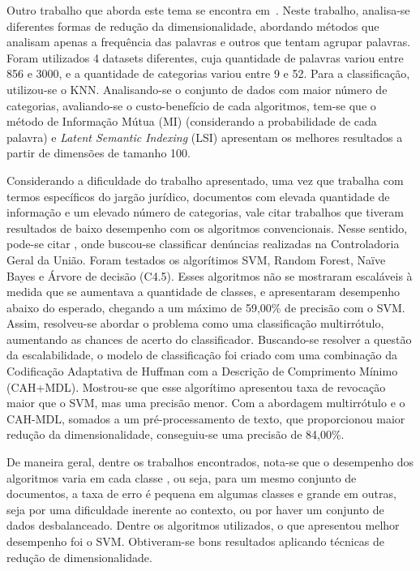 Outro trabalho que aborda este tema se encontra em~\cite{ciarelli_agglomeration_2009}. Neste trabalho, analisa-se diferentes formas de redução da dimensionalidade, abordando métodos que analisam apenas a frequência das palavras e outros que tentam agrupar palavras. Foram utilizados 4 datasets diferentes, cuja quantidade de palavras variou entre 856 e 3000, e a quantidade de categorias variou entre 9 e 52. Para a classificação, utilizou-se o KNN. Analisando-se o conjunto de dados com maior número de categorias, avaliando-se o custo-benefício de cada algoritmos, tem-se que o método de Informação Mútua (MI) (considerando a probabilidade de cada palavra) e \textit{Latent Semantic Indexing }(LSI) apresentam os melhores resultados a partir de dimensões de tamanho 100.

Considerando a dificuldade do trabalho apresentado, uma vez que trabalha com termos específicos do jargão jurídico, documentos com elevada quantidade de informação e um elevado número de categorias, vale citar trabalhos que tiveram resultados de baixo desempenho com os algoritmos convencionais. Nesse sentido, pode-se citar \cite{ladeirahuffman}, onde buscou-se classificar denúncias realizadas na Controladoria Geral da União. Foram testados os algorítimos SVM, Random Forest, Naïve Bayes e Árvore de decisão (C4.5). Esses algoritmos não se mostraram escaláveis à medida que se aumentava a quantidade de classes, e apresentaram desempenho abaixo do esperado, chegando a um máximo de 59,00\% de precisão com o SVM. Assim, resolveu-se abordar o problema como uma classificação multirrótulo, aumentando as chances de acerto do classificador. Buscando-se resolver a questão da escalabilidade, o modelo de classificação foi criado com uma combinação da Codificação Adaptativa de Huffman com a Descrição de Comprimento Mínimo (CAH+MDL). Mostrou-se que esse algorítimo apresentou taxa de revocação maior que o SVM, mas uma precisão menor. Com a abordagem multirrótulo e o CAH-MDL, somados a um pré-processamento de texto, que proporcionou maior redução da dimensionalidade, conseguiu-se uma precisão de 84,00\%.

De maneira geral, dentre os trabalhos encontrados, nota-se que o desempenho dos algoritmos varia em cada classe \cite{de_maat_machine_2010,goncalves_is_2005}, ou seja, para um mesmo conjunto de documentos, a taxa de erro é pequena em algumas classes e grande em outras, seja por uma dificuldade inerente ao contexto, ou por haver um conjunto de dados desbalanceado. 
Dentre os algoritmos utilizados, o que apresentou melhor desempenho foi o SVM. Obtiveram-se bons resultados aplicando técnicas de redução de dimensionalidade.
